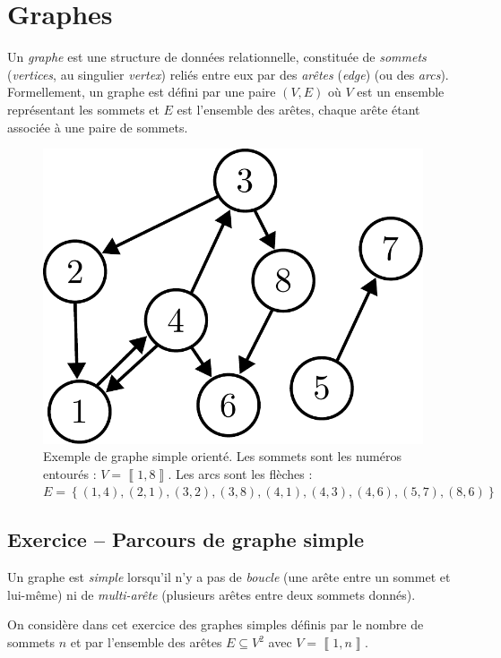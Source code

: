 \documentclass{article}
\newcounter{loop}
\newcounter{numEx}
\newcommand{\exo}[1]{
	\stepcounter{numEx}
	\setcounter{loop}{0}
	\subsection*{Exercice \arabic{numEx} -- #1}
}
\newcommand{\llbra}{\left\llbracket}
\newcommand{\rrbra}{\right\rrbracket}
\renewcommand{\brack}[1]{\ensuremath{\llbra#1\rrbra}}
\begin{document}
\section{Graphes}

Un \emph{graphe} est une structure de données relationnelle, constituée de \emph{sommets} (\textit{vertices}, au singulier \textit{vertex}) reliés entre eux par des \emph{arêtes} (\textit{edge}) (ou des \emph{arcs}). Formellement, un graphe est défini par une paire $(V, E)$ où $V$ est un ensemble représentant les sommets et $E$ est l'ensemble des arêtes, chaque arête étant associée à une paire de sommets.

\begin{figure}[bh]
	\centering
	\includegraphics[width=0.5\linewidth]{../figures/graph.pdf}
	\caption{Exemple de graphe simple orienté. Les sommets sont les numéros entourés : $V = \brack{1,8}$. Les arcs sont les flèches : $E = \left\{(1,4), (2, 1), (3, 2), (3, 8), (4, 1), (4, 3), (4, 6), (5, 7), (8, 6)\right\}$}
\end{figure}

\exo{Parcours de graphe simple}

Un graphe est \emph{simple} lorsqu'il n'y a pas de \emph{boucle} (une arête entre un sommet et lui-même) ni de \emph{multi-arête} (plusieurs arêtes entre deux sommets donnés).

On considère dans cet exercice des graphes simples définis par le nombre de sommets $n$ et par l'ensemble des arêtes $E\subseteq V^2$ avec $V = \brack{1,n}$.
\end{document}

